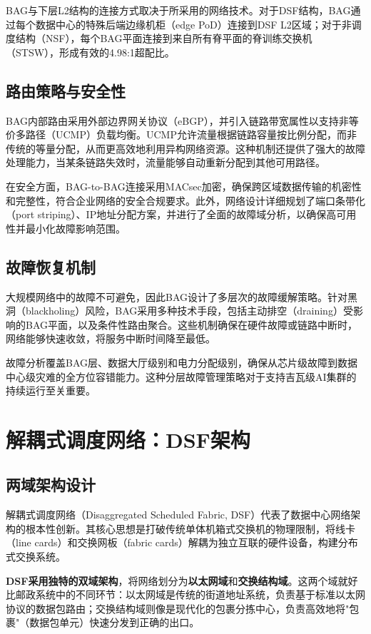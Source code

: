 BAG与下层L2结构的连接方式取决于所采用的网络技术。对于DSF结构，BAG通过每个数据中心的特殊后端边缘机柜（edge PoD）连接到DSF L2区域；对于非调度结构（NSF），每个BAG平面连接到来自所有脊平面的脊训练交换机（STSW），形成有效的4.98:1超配比。

\subsection{路由策略与安全性}

BAG内部路由采用外部边界网关协议（eBGP），并引入链路带宽属性以支持非等价多路径（UCMP）负载均衡。UCMP允许流量根据链路容量按比例分配，而非传统的等量分配，从而更高效地利用异构网络资源。这种机制还提供了强大的故障处理能力，当某条链路失效时，流量能够自动重新分配到其他可用路径。

在安全方面，BAG-to-BAG连接采用MACsec加密，确保跨区域数据传输的机密性和完整性，符合企业网络的安全合规要求。此外，网络设计详细规划了端口条带化（port striping）、IP地址分配方案，并进行了全面的故障域分析，以确保高可用性并最小化故障影响范围。

\subsection{故障恢复机制}

大规模网络中的故障不可避免，因此BAG设计了多层次的故障缓解策略。针对黑洞（blackholing）风险，BAG采用多种技术手段，包括主动排空（draining）受影响的BAG平面，以及条件性路由聚合。这些机制确保在硬件故障或链路中断时，网络能够快速收敛，将服务中断时间降至最低。

故障分析覆盖BAG层、数据大厅级别和电力分配级别，确保从芯片级故障到数据中心级灾难的全方位容错能力。这种分层故障管理策略对于支持吉瓦级AI集群的持续运行至关重要。

\section{解耦式调度网络：DSF架构}

\subsection{两域架构设计}

解耦式调度网络（Disaggregated Scheduled Fabric, DSF）代表了数据中心网络架构的根本性创新。其核心思想是打破传统单体机箱式交换机的物理限制，将线卡（line cards）和交换网板（fabric cards）解耦为独立互联的硬件设备，构建分布式交换系统。

\textbf{DSF采用独特的双域架构}，将网络划分为\textbf{以太网域}和\textbf{交换结构域}。这两个域就好比邮政系统中的不同环节：以太网域是传统的街道地址系统，负责基于标准以太网协议的数据包路由；交换结构域则像是现代化的包裹分拣中心，负责高效地将"包裹"（数据包单元）快速分发到正确的出口。

